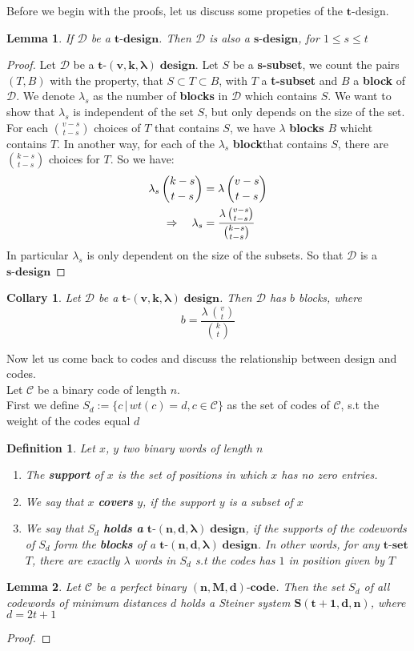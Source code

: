 \documentclass{article}
\newtheorem{lemma}{Lemma}
\newtheorem{definition}{Definition}
\newtheorem{collary}{Collary}
\newcommand{\tCompleteDesign}{\ensuremath{\bm{t\mbox{-}(v,k,\lambda)\; design}}}
\newcommand{\tParamDesign}[4]{\ensuremath{\bm{#1\mbox{-}(#2,#3,#4)\; design}}}
\newcommand{\steinerSystem}[3]{\ensuremath{\bm{S(#1,#2,#3)}}}
\newcommand{\myBlock}{\textbf{block}}
\newcommand{\pluralMyBlock}{\textbf{blocks}}
\newcommand{\xDesign}[1]{\ensuremath{\bm{#1\mbox{-}design}}}
\newcommand{\dDes}{\ensuremath{\mathscr{D}}}
\newcommand{\cCodes}{\ensuremath{\mathscr{C}}}
\newcommand{\tSet}[1]{\ensuremath{\bm{#1\mbox{-}{set}}}}
\newcommand{\code}[3]{\ensuremath{\bm{(#1,#2,#3)\mbox{-}code}}}
\begin{document}
Before we begin with the proofs, let us discuss some propeties of the $\bm{t}$-design.
\begin{lemma}\label{propTdesign}
If $\mathscr{D}$ be a $\bm{t\mbox{-}design}$. Then $\mathscr{D}$ is also a $\bm{s\mbox{-}design}$, for $1 \leq s \leq t$
\end{lemma}
\begin{proof}
Let $\mathscr{D}$ be a \tCompleteDesign.
Let $S$ be a \textbf{s-subset}, we count the pairs $(T,B)$ with the property, that $S \subset T \subset B$, with $T$ a \textbf{t-subset} and $B$ a \textbf{block} of $\mathscr{D}$. We denote $\lambda_s$ as the number of \textbf{blocks} in $\mathscr{D}$ which contains $S$. We want to show that $\lambda_s$ is independent of the set $S$, but only depends on the size of the set. 
For each $\binom{v-s}{t-s}$ choices of $T$ that contains $S$, we have $\lambda$ {\pluralMyBlock} $B$ whicht contains $T$. In another way, for each of the $\lambda_s$ \myBlock that contains $S$, there are $\binom{k-s}{t-s}$ choices for $T$. So we have:
\begin{align}
	\lambda_s \, \binom{k-s}{t-s} &= \lambda \, \binom{v-s}{t-s} \notag\\
	\Rightarrow  \quad \lambda_s &= \frac{\lambda \, \binom{v-s}{t-s}}{\binom{k-s}{t-s}} \label{sDesign}
\end{align}
In particular $\lambda_s$ is only dependent on the size of the subsets. So that $\mathscr{D}$ is a \xDesign{s}
\end{proof}

\begin{collary}
Let {\dDes} be a \tCompleteDesign.
Then {\dDes} has $b$ blocks, where
\[
	b = \frac{\lambda \, \binom{v}{t}}{\binom{k}{t}}
\]
\end{collary}

Now let us come back to codes and discuss the relationship between design and codes.\\
Let {\cCodes} be a binary code of length $n$.\\
First we define $S_d := \{c\,|\,wt(c) = d, c \in \cCodes\}$ as the set of codes of \cCodes, s.t the weight of the codes equal $d$

\begin{definition}
	Let $x$, $y$ two binary words of length $n$
	\begin{enumerate}
		\item The \textbf{support} of $x$ is the set of positions in which $x$ has no zero entries.
		\item We say that $x$ \textbf{covers} $y$, if the support $y$ is a subset of $x$
		\item We say that $S_d$ \textbf{holds a } {\tParamDesign{t}{n}{d}{\lambda}}, if the supports of the codewords of $S_d$ form the {\pluralMyBlock} of a {\tParamDesign{t}{n}{d}{\lambda}}. In other words, for any {\tSet{t}} $T$, there are exactly $\lambda$ words in $S_d$ s.t the codes has $1$ in position given by $T$
	\end{enumerate}
\end{definition}

\begin{lemma}
Let {\cCodes} be a perfect binary {\code{n}{M}{d}}. Then the set $S_d$ of all codewords of minimum distances $d$ holds a \emph{Steiner system} \steinerSystem{t+1}{d}{n}, where $d = 2t + 1$
\end{lemma}

\begin{proof}

\end{proof}
\end{document}
